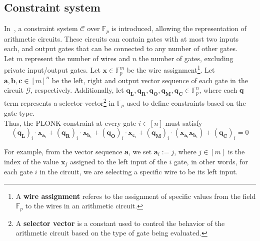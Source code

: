 \subsection{Constraint system}
In~\cite{gabizon2019plonk}, a constraint system $\mathcal{C}$ over $\mathbb{F}_p$ is introduced, allowing the representation of arithmetic circuits. These circuits can contain gates with at most two inputs each, and output gates that can be connected to any number of other gates.\\
Let $m$ represent the number of wires and $n$ the number of gates, excluding private input/output gates. Let $\textbf{x}\in\mathbb{F}_p^m$ be the wire assignment\footnote{A \textbf{wire assignment} referes to the assignment of specific values from the field $\mathbb{F}_p$ to the wires in an arithmetic circuit.}. Let $\textbf{a},\textbf{b},\textbf{c}\in[m]^n$ be the left, right and output vector sequence of each gate in the circuit $\mathcal{G}$, respectively. Additionally, let $\textbf{q}_\textbf{L},\textbf{q}_\textbf{R},\textbf{q}_\textbf{O},\textbf{q}_\textbf{M},\textbf{q}_\textbf{C}\in\mathbb{F}_p^n$, where each \textbf{q} term represents a selector vector\footnote{A \textbf{selector vector} is a constant used to control the behavior of the arithmetic circuit based on the type of gate being evaluated.} in $\mathbb{F}_p$ used to define constraints based on the gate type.\\
Thus, the PLONK constraint at every gate $i\in[n]$ must satisfy
\begin{equation}
    \left(\textbf{q}_\textbf{L}\right)_i\cdot\textbf{x}_{\textbf{a}_i}+ \left(\textbf{q}_\textbf{R}\right)_i\cdot\textbf{x}_{\textbf{b}_i} + \left(\textbf{q}_\textbf{O}\right)_i\cdot\textbf{x}_{\textbf{c}_i} + \left(\textbf{q}_\textbf{M}\right)_i\cdot\left(\textbf{x}_{\textbf{a}_i}\textbf{x}_{\textbf{b}_i}\right) + \left(\textbf{q}_\textbf{C}\right)_i=0
    \label{eq:plonk-constraint}
\end{equation}

For example, from the vector sequence \textbf{a}, we set $\textbf{a}_i:=j$, where $j\in[m]$ is the index of the value $\textbf{x}_j$ assigned to the left input of the $i$ gate, in other words, for each gate $i$ in the circuit, we are selecting a specific wire to be its left input.

